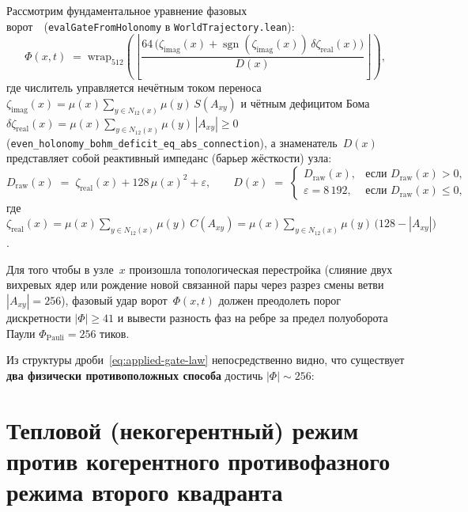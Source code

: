 Рассмотрим фундаментальное уравнение фазовых ворот~\latGCKshort\ (\texttt{evalGateFromHolonomy} в \texttt{WorldTrajectory.lean}):
\begin{equation}
\label{eq:applied-gate-law}
  \Phi(x,t) \;=\; \mathrm{wrap}_{512}\!\left(\left\lfloor \frac{64\,\bigl(\zeta_{\mathrm{imag}}(x) + \operatorname{sgn}(\zeta_{\mathrm{imag}}(x))\,\delta\zeta_{\mathrm{real}}(x)\bigr)}{D(x)} \right\rfloor\right),
\end{equation}
где числитель управляется нечётным током переноса $\zeta_{\mathrm{imag}}(x) = \mu(x)\sum_{y\in N_{12}(x)}\mu(y)\,S(A_{xy})$ и чётным дефицитом Бома $\delta\zeta_{\mathrm{real}}(x) = \mu(x)\sum_{y\in N_{12}(x)}\mu(y)\,|A_{xy}| \ge 0$ (\texttt{even\_\allowbreak holonomy\_\allowbreak bohm\_\allowbreak deficit\_\allowbreak eq\_\allowbreak abs\_\allowbreak connection}), а знаменатель~$D(x)$ представляет собой реактивный импеданс (барьер жёсткости) узла:
\begin{equation}
\label{eq:applied-denominator-impedance}
  D_{\mathrm{raw}}(x) \;=\; \zeta_{\mathrm{real}}(x) + 128\,\mu(x)^2 + \varepsilon,
  \qquad
  D(x) \;=\; \begin{cases}
    D_{\mathrm{raw}}(x), & \text{если } D_{\mathrm{raw}}(x) > 0,\\
    \varepsilon = 8\,192, & \text{если } D_{\mathrm{raw}}(x) \le 0,
  \end{cases}
\end{equation}
где $\zeta_{\mathrm{real}}(x) = \mu(x)\sum_{y\in N_{12}(x)}\mu(y)\,C(A_{xy}) = \mu(x)\sum_{y\in N_{12}(x)}\mu(y)\,\bigl(128 - |A_{xy}|\bigr)$.

Для того чтобы в узле~$x$ произошла топологическая перестройка (слияние двух вихревых ядер или рождение новой связанной пары через разрез смены ветви $|A_{xy}| = 256$), фазовый удар ворот~$\Phi(x,t)$ должен преодолеть порог дискретности $|\Phi| \ge 41$ и вывести разность фаз на ребре за предел полуоборота Паули $\Phi_{\mathrm{Pauli}} = 256$ тиков.

Из структуры дроби~\eqref{eq:applied-gate-law} непосредственно видно, что существует \textbf{два физически противоположных способа} достичь $|\Phi| \sim 256$:

\section{Тепловой (некогерентный) режим против когерентного противофазного режима второго квадранта}
\label{sec:applied-thermal-vs-coherent}

